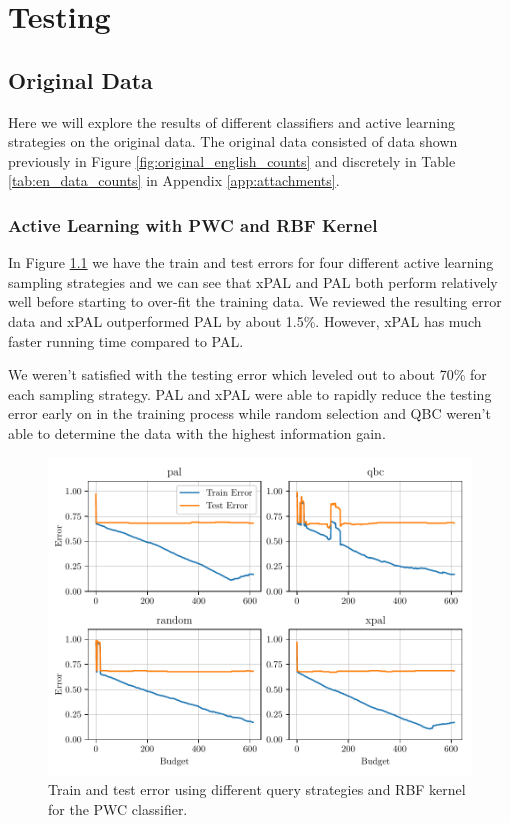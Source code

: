 \chapter{Testing}

\section{Original Data}

Here we will explore the results of different classifiers and active learning strategies on the original data. The original data consisted of data shown previously in Figure \ref{fig:original_english_counts} and discretely in Table \ref{tab:en_data_counts} in Appendix \ref{app:attachments}. 

\subsection{Active Learning with PWC and RBF Kernel}

In Figure \ref{fig:plot_all_results_rbf} we have the train and test errors for four different active learning sampling strategies and we can see that xPAL and PAL both perform relatively well before starting to over-fit the training data. We reviewed the resulting error data and xPAL outperformed PAL by about 1.5\%. However, xPAL has much faster running time compared to PAL.

We weren't satisfied with the testing error which leveled out to about 70\% for each sampling strategy. PAL and xPAL were able to rapidly reduce the testing error early on in the training process while random selection and QBC weren't able to determine the data with the highest information gain. 

\begin{figure}[ht]
  \centering
  \includegraphics[width=\textwidth]{../img/plot_all_results_rbf.pdf}
  \caption{Train and test error using different query strategies and RBF kernel for the PWC classifier.}
  \label{fig:plot_all_results_rbf}
\end{figure}

